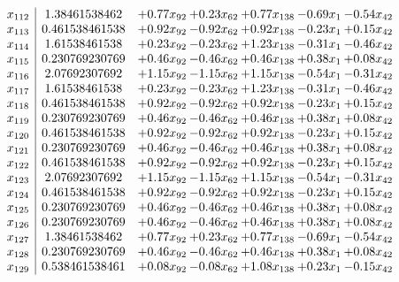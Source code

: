 \documentclass[8pt]{article}
\begin{document}
\[\begin{array}{c| c c@{\hskip 2pt} c@{\hskip 2pt} c@{\hskip 2pt} c@{\hskip 2pt} c@{\hskip 2pt} }
 x_{112}   &  1.38461538462 & +  0.77 x_{92} & +  0.23 x_{62} & +  0.77 x_{138} & -0.69 x_{1} & -0.54 x_{42}\\
 x_{113}   &  0.461538461538 & +  0.92 x_{92} & -0.92 x_{62} & +  0.92 x_{138} & -0.23 x_{1} & +  0.15 x_{42}\\
 x_{114}   &  1.61538461538 & +  0.23 x_{92} & -0.23 x_{62} & +  1.23 x_{138} & -0.31 x_{1} & -0.46 x_{42}\\
 x_{115}   &  0.230769230769 & +  0.46 x_{92} & -0.46 x_{62} & +  0.46 x_{138} & +  0.38 x_{1} & +  0.08 x_{42}\\
 x_{116}   &  2.07692307692 & +  1.15 x_{92} & -1.15 x_{62} & +  1.15 x_{138} & -0.54 x_{1} & -0.31 x_{42}\\
 x_{117}   &  1.61538461538 & +  0.23 x_{92} & -0.23 x_{62} & +  1.23 x_{138} & -0.31 x_{1} & -0.46 x_{42}\\
 x_{118}   &  0.461538461538 & +  0.92 x_{92} & -0.92 x_{62} & +  0.92 x_{138} & -0.23 x_{1} & +  0.15 x_{42}\\
 x_{119}   &  0.230769230769 & +  0.46 x_{92} & -0.46 x_{62} & +  0.46 x_{138} & +  0.38 x_{1} & +  0.08 x_{42}\\
 x_{120}   &  0.461538461538 & +  0.92 x_{92} & -0.92 x_{62} & +  0.92 x_{138} & -0.23 x_{1} & +  0.15 x_{42}\\
 x_{121}   &  0.230769230769 & +  0.46 x_{92} & -0.46 x_{62} & +  0.46 x_{138} & +  0.38 x_{1} & +  0.08 x_{42}\\
 x_{122}   &  0.461538461538 & +  0.92 x_{92} & -0.92 x_{62} & +  0.92 x_{138} & -0.23 x_{1} & +  0.15 x_{42}\\
 x_{123}   &  2.07692307692 & +  1.15 x_{92} & -1.15 x_{62} & +  1.15 x_{138} & -0.54 x_{1} & -0.31 x_{42}\\
 x_{124}   &  0.461538461538 & +  0.92 x_{92} & -0.92 x_{62} & +  0.92 x_{138} & -0.23 x_{1} & +  0.15 x_{42}\\
 x_{125}   &  0.230769230769 & +  0.46 x_{92} & -0.46 x_{62} & +  0.46 x_{138} & +  0.38 x_{1} & +  0.08 x_{42}\\
 x_{126}   &  0.230769230769 & +  0.46 x_{92} & -0.46 x_{62} & +  0.46 x_{138} & +  0.38 x_{1} & +  0.08 x_{42}\\
 x_{127}   &  1.38461538462 & +  0.77 x_{92} & +  0.23 x_{62} & +  0.77 x_{138} & -0.69 x_{1} & -0.54 x_{42}\\
 x_{128}   &  0.230769230769 & +  0.46 x_{92} & -0.46 x_{62} & +  0.46 x_{138} & +  0.38 x_{1} & +  0.08 x_{42}\\
 x_{129}   &  0.538461538461 & +  0.08 x_{92} & -0.08 x_{62} & +  1.08 x_{138} & +  0.23 x_{1} & -0.15 x_{42}\\

\end{array}\]
\end{document}
